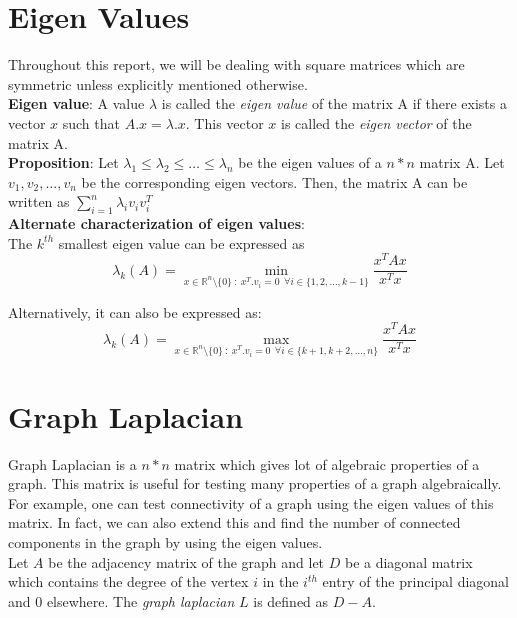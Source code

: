 \documentclass[BTech]{iitmdiss}
\begin{document}
	     \section{Eigen Values}
	       Throughout this report, we will be dealing with square matrices which are symmetric unless explicitly mentioned otherwise. \\
	       
	       \textbf{Eigen value}: A value $\lambda$ is called the \textit{eigen value} of the matrix A if there exists a vector $x$ such that 
	       $A.x = \lambda . x$. This vector $x$ is called the \textit{eigen vector} of the matrix A. \\
	       
	       \textbf{Proposition}: Let $\lambda_1 \leq \lambda_2 \leq \ldots \leq \lambda_n$ be the eigen values of a $n \ast n$ matrix
	       A. Let $v_1 , v_2 , \ldots, v_n$ be the corresponding eigen vectors. Then, the matrix A can be written as $\displaystyle\sum_{i=1}^{n} \lambda_i v_i v_i^T$ \\
	       
	       \textbf{Alternate characterization of eigen values}: \\
	       
		The $k^{th}$ smallest eigen value can be expressed as 
		$$\lambda_k(A) = \displaystyle\min_{x \in \mathbb{R}^n \setminus \{0\}~:~x^T.v_i = 0~~\forall i \in \{1,2,\ldots,k-1\}} \frac{x^TAx}{x^Tx}$$
		
		Alternatively, it can also be expressed as:
		$$\lambda_k(A) = \displaystyle\max_{x \in \mathbb{R}^n \setminus \{0\}~:~x^T.v_i = 0~~\forall i \in \{k+1,k+2,\ldots,n\}} \frac{x^TAx}{x^Tx}$$
	       
	    \section{Graph Laplacian}
		Graph Laplacian is a $n \ast n$ matrix which gives lot of algebraic properties of a graph. This matrix is useful for testing many properties
		of a graph algebraically. For example, one can test connectivity of a graph using the eigen values of this matrix. In fact, we can also extend
		this and find the number of connected components in the graph by using the eigen values. \\
		
		Let $A$ be the adjacency matrix of the graph and let $D$ be a diagonal matrix which contains the degree of the vertex $i$ in the 
		$i^{th}$ entry of the principal diagonal and 0 elsewhere. The \textit{graph laplacian} $L$ is defined as $D - A$. \\
		
\end{document}
